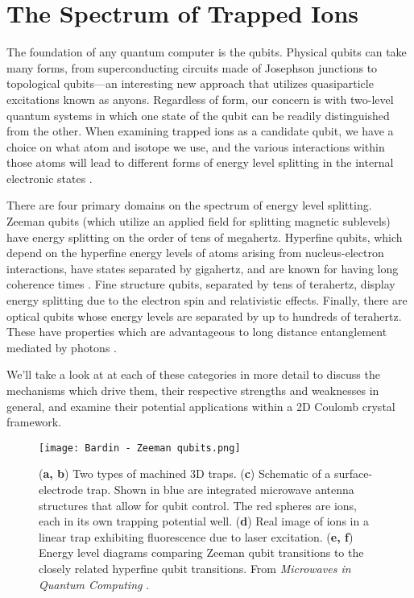 \section{The Spectrum of Trapped Ions}
The foundation of any quantum computer is the qubits. Physical qubits can take many forms, from superconducting circuits made of Josephson junctions to topological qubits---an interesting new approach that utilizes quasiparticle excitations known as anyons. Regardless of form, our concern is with two-level quantum systems in which one state of the qubit can be readily distinguished from the other. When examining trapped ions as a candidate qubit, we have a choice on what atom and isotope we use, and the various interactions within those atoms will lead to different forms of energy level splitting in the internal electronic states \cite{Bruzewicz}. 

There are four primary domains on the spectrum of energy level splitting. Zeeman qubits (which utilize an applied field for splitting magnetic sublevels) have energy splitting on the order of tens of megahertz. Hyperfine qubits, which depend on the hyperfine energy levels of atoms arising from nucleus-electron interactions, have states separated by gigahertz, and are known for having long coherence times \cite{Warring}. Fine structure qubits, separated by tens of terahertz, display energy splitting due to the electron spin and relativistic effects. Finally, there are optical qubits whose energy levels are separated by up to hundreds of terahertz. These have properties which are advantageous to long distance entanglement mediated by photons \cite{Dietrich}.

We'll take a look at at each of these categories in more detail to discuss the mechanisms which drive them, their respective strengths and weaknesses in general, and examine their potential applications within a 2D Coulomb crystal framework.

\begin{figure}[ht]
    \texttt{[image: Bardin - Zeeman qubits.png]}
    \caption{(\textbf{a, b}) Two types of machined 3D traps. (\textbf{c}) Schematic of a surface-electrode trap. Shown in blue are integrated microwave antenna structures that allow for qubit control. The red spheres are ions, each in its own trapping potential well. (\textbf{d}) Real image of ions in a linear trap exhibiting fluorescence due to laser excitation. (\textbf{e, f}) Energy level diagrams comparing Zeeman qubit transitions to the closely related hyperfine qubit transitions. From \textit{Microwaves in Quantum Computing} \cite{Bardin}.}
    \label{fig:Zeeman qubit}
\end{figure}

